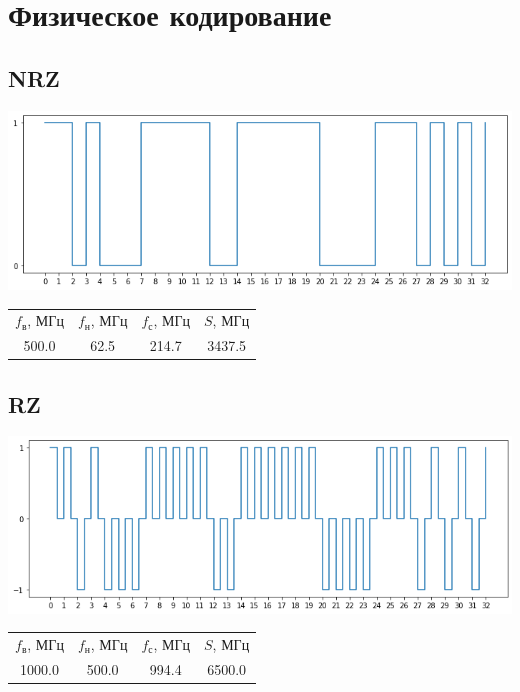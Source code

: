 \section{Физическое кодирование}
\subsection{NRZ}
\includegraphics[width=\textwidth]{1nrz}
\begin{center}
    \begin{tabular}{cccc}
        $f_\mathrm{\text{в}}$, МГц & $f_\mathrm{\text{н}}$, МГц & $f_\mathrm{\text{с}}$, МГц & $S$, МГц \\
        500.0 & 62.5 & 214.7 & 3437.5 \\
    \end{tabular}
\end{center}

\subsection{RZ}
\includegraphics[width=\textwidth]{1rz}
\begin{center}
    \begin{tabular}{cccc}
        $f_\mathrm{\text{в}}$, МГц & $f_\mathrm{\text{н}}$, МГц & $f_\mathrm{\text{с}}$, МГц & $S$, МГц \\
        1000.0 & 500.0 & 994.4 & 6500.0 \\
    \end{tabular}
\end{center}

